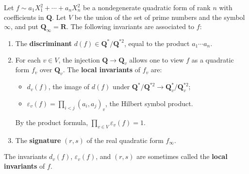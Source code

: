 Let $f \sim a_1 X_1^2 + \cdots + a_n X_n^2$ be a nondegenerate quadratic form of rank $n$ with coefficients in $\mathbf{Q}$. Let $V$ be the union of the set of prime numbers and the symbol $\infty$, and put $\mathbf{Q}_{\infty} = \mathbf{R}$. The following invariants are associated to $f$:

\begin{enumerate}
\item[(a)] The \textbf{discriminant} $d(f) \in \mathbf{Q}^*/\mathbf{Q}^{*2}$, equal to the product $a_1 \cdots a_n$.

\item[(b)] For each $v \in V$, the injection $\mathbf{Q} \to \mathbf{Q}_v$ allows one to view $f$ as a quadratic form $f_v$ over $\mathbf{Q}_v$. The \textbf{local invariants} of $f_v$ are:
  \begin{itemize}
  \item $d_v(f)$, the image of $d(f)$ under $\mathbf{Q}^*/\mathbf{Q}^{*2} \to \mathbf{Q}_v^*/\mathbf{Q}_v^{*2}$;
  \item $\varepsilon_v(f) = \prod_{i < j} (a_i, a_j)_v$, the Hilbert symbol product.
  \end{itemize}
  By the product formula, $\prod_{v \in V} \varepsilon_v(f) = 1$.

\item[(c)] The \textbf{signature} $(r, s)$ of the real quadratic form $f_{\infty}$.
\end{enumerate}

The invariants $d_v(f)$, $\varepsilon_v(f)$, and $(r, s)$ are sometimes called the \textbf{local invariants} of $f$.
